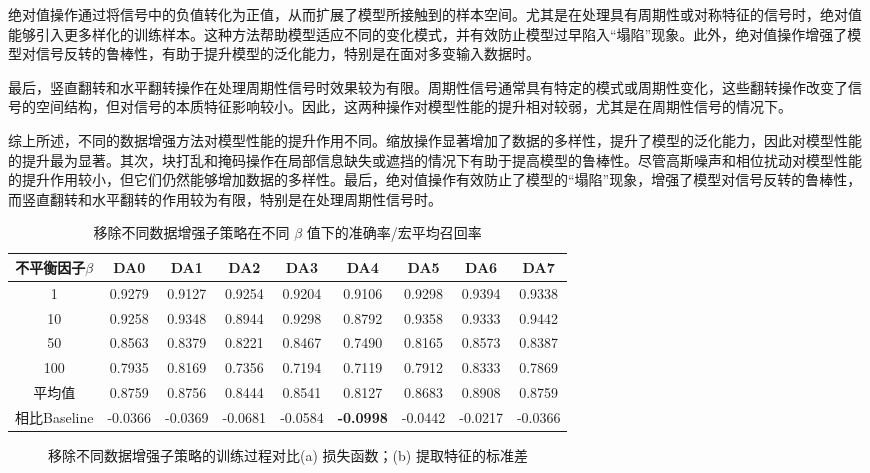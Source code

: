 \documentclass[master]{thesis-uestc}
\begin{document}
绝对值操作通过将信号中的负值转化为正值，从而扩展了模型所接触到的样本空间。尤其是在处理具有周期性或对称特征的信号时，绝对值能够引入更多样化的训练样本。这种方法帮助模型适应不同的变化模式，并有效防止模型过早陷入“塌陷”现象。此外，绝对值操作增强了模型对信号反转的鲁棒性，有助于提升模型的泛化能力，特别是在面对多变输入数据时。

最后，竖直翻转和水平翻转操作在处理周期性信号时效果较为有限。周期性信号通常具有特定的模式或周期性变化，这些翻转操作改变了信号的空间结构，但对信号的本质特征影响较小。因此，这两种操作对模型性能的提升相对较弱，尤其是在周期性信号的情况下。

综上所述，不同的数据增强方法对模型性能的提升作用不同。缩放操作显著增加了数据的多样性，提升了模型的泛化能力，因此对模型性能的提升最为显著。其次，块打乱和掩码操作在局部信息缺失或遮挡的情况下有助于提高模型的鲁棒性。尽管高斯噪声和相位扰动对模型性能的提升作用较小，但它们仍然能够增加数据的多样性。最后，绝对值操作有效防止了模型的“塌陷”现象，增强了模型对信号反转的鲁棒性，而竖直翻转和水平翻转的作用较为有限，特别是在处理周期性信号时。

\begin{table}
    \caption{移除不同数据增强子策略在不同 $\beta$ 值下的准确率/宏平均召回率}
    \centering
    \begin{tabular}{ccccccccc}
    \toprule
    不平衡因子$\beta$  & DA0 & DA1 & DA2 & DA3 & DA4 & DA5 & DA6 & DA7 \\
    \midrule
    1   & 0.9279  & 0.9127 & 0.9254 & 0.9204 & 0.9106 & 0.9298 & 0.9394 & 0.9338  \\
    10  & 0.9258  & 0.9348 & 0.8944 & 0.9298 & 0.8792 & 0.9358 & 0.9333 & 0.9442  \\
    50  & 0.8563  & 0.8379 & 0.8221 & 0.8467 & 0.7490 & 0.8165 & 0.8573 & 0.8387  \\
    100 & 0.7935  & 0.8169 & 0.7356 & 0.7194 & 0.7119 & 0.7912 & 0.8333 & 0.7869  \\
    \midrule
    平均值 & 0.8759 & 0.8756 & 0.8444 & 0.8541 & 0.8127 & 0.8683 & 0.8908 & 0.8759 \\
    \midrule
    相比Baseline & -0.0366 & -0.0369 & -0.0681 & -0.0584 & \textbf{-0.0998} & -0.0442 & -0.0217 & -0.0366 \\
    \bottomrule
    \end{tabular}
    \label{tb:da_discuss_results}
\end{table}

\begin{figure}[h]
    \centering
    \caption{移除不同数据增强子策略的训练过程对比(a) 损失函数；(b) 提取特征的标准差}
    \label{train_process_da_discuss}
\end{figure}
\end{document}
